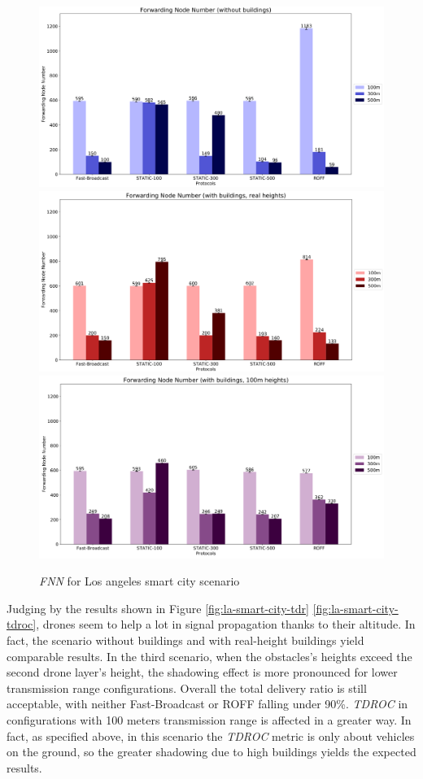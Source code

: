 	\begin{figure}[H]
		\centering
		\includegraphics[width=1.0\textwidth]{immagini/la-smart-city/b0/fnn}
		\includegraphics[width=1.0\textwidth]{immagini/la-smart-city/b1/h0/fnn}
		\includegraphics[width=1.0\textwidth]{immagini/la-smart-city/b1//h1/fnn}
		\caption{\textit{FNN} for Los angeles smart city scenario}
		\label{fig:la-smart-city-fnn}
	\end{figure}

	Judging by the results shown in Figure \ref{fig:la-smart-city-tdr} \ref{fig:la-smart-city-tdroc}, drones seem to help a lot in signal propagation thanks to their altitude. In fact, the scenario without buildings and with real-height buildings yield comparable results. In the third scenario, when the obstacles's heights exceed the second drone layer's height, the shadowing effect is more pronounced for lower transmission range configurations. Overall the total delivery ratio is still acceptable, with neither Fast-Broadcast or ROFF falling under 90\%. \textit{TDROC} in configurations with 100 meters transmission range is affected in a greater way. In fact, as specified above, in this scenario the \textit{TDROC} metric is only about vehicles on the ground, so the greater shadowing due to high buildings yields the expected results.
	

